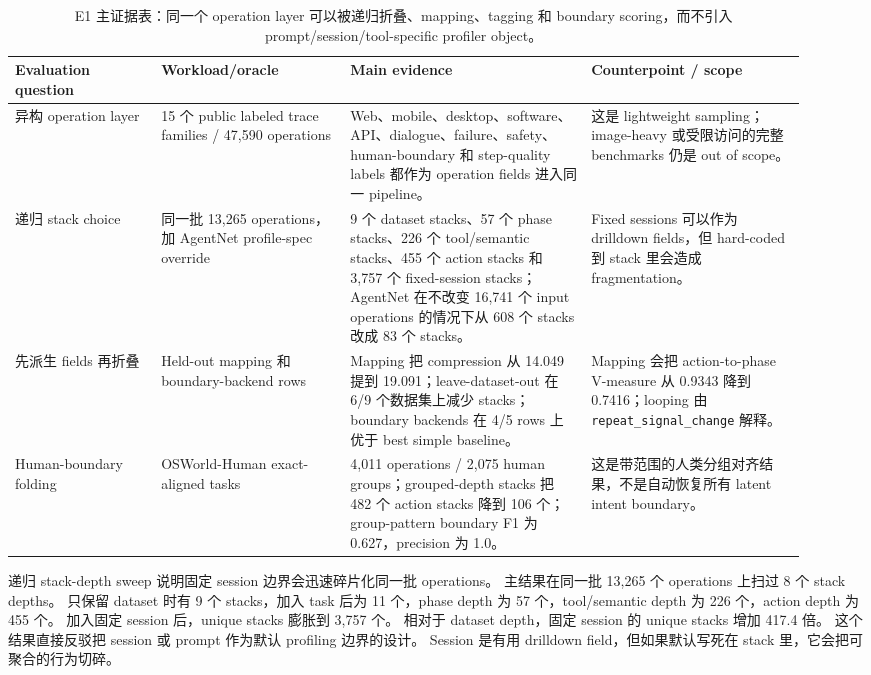 \documentclass[10pt,twocolumn]{ctexart}
\begin{document}
\begin{table}[t]
\centering
\scriptsize
\setlength{\tabcolsep}{3pt}
\caption{E1 主证据表：同一个 operation layer 可以被递归折叠、mapping、tagging 和 boundary scoring，而不引入 prompt/session/tool-specific profiler object。}
\label{tab:e1-abstraction-evidence}
\begin{tabular}{p{0.17\linewidth}p{0.22\linewidth}p{0.28\linewidth}p{0.25\linewidth}}
\toprule
Evaluation question & Workload/oracle & Main evidence & Counterpoint / scope \\
\midrule
异构 operation layer &
15 个 public labeled trace families / 47,590 operations &
Web、mobile、desktop、software、API、dialogue、failure、safety、human-boundary 和 step-quality labels 都作为 operation fields 进入同一 pipeline。 &
这是 lightweight sampling；image-heavy 或受限访问的完整 benchmarks 仍是 out of scope。 \\
递归 stack choice &
同一批 13,265 operations，加 AgentNet profile-spec override &
9 个 dataset stacks、57 个 phase stacks、226 个 tool/semantic stacks、455 个 action stacks 和 3,757 个 fixed-session stacks；AgentNet 在不改变 16,741 个 input operations 的情况下从 608 个 stacks 改成 83 个 stacks。 &
Fixed sessions 可以作为 drilldown fields，但 hard-coded 到 stack 里会造成 fragmentation。 \\
先派生 fields 再折叠 &
Held-out mapping 和 boundary-backend rows &
Mapping 把 compression 从 14.049 提到 19.091；leave-dataset-out 在 6/9 个数据集上减少 stacks；boundary backends 在 4/5 rows 上优于 best simple baseline。 &
Mapping 会把 action-to-phase V-measure 从 0.9343 降到 0.7416；looping 由 \texttt{repeat\_signal\_change} 解释。 \\
Human-boundary folding &
OSWorld-Human exact-aligned tasks &
4,011 operations / 2,075 human groups；grouped-depth stacks 把 482 个 action stacks 降到 106 个；group-pattern boundary F1 为 0.627，precision 为 1.0。 &
这是带范围的人类分组对齐结果，不是自动恢复所有 latent intent boundary。 \\
\bottomrule
\end{tabular}
\end{table}

递归 stack-depth sweep 说明固定 session 边界会迅速碎片化同一批 operations。
主结果在同一批 13,265 个 operations 上扫过 8 个 stack depths。
只保留 dataset 时有 9 个 stacks，加入 task 后为 11 个，phase depth 为 57 个，tool/semantic depth 为 226 个，action depth 为 455 个。
加入固定 session 后，unique stacks 膨胀到 3,757 个。
相对于 dataset depth，固定 session 的 unique stacks 增加 417.4 倍。
这个结果直接反驳把 session 或 prompt 作为默认 profiling 边界的设计。
Session 是有用 drilldown field，但如果默认写死在 stack 里，它会把可聚合的行为切碎。
\end{document}
